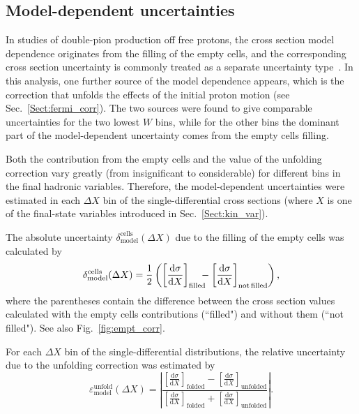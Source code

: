 \documentclass[prc,twocolumn,superscriptaddress,showpacs,amssymb,amsmath,amsfonts,aps,nofootinbib]{revtex4-1}
\begin{document}
\subsection{Model-dependent uncertainties}
\label{Sect:mod_dep}

In studies of double-pion production off free protons, the cross section model dependence originates from the filling of the empty cells, and the corresponding cross section uncertainty is commonly treated as a separate uncertainty type~\cite{Rip_an_note:2002,Ripani:2002ss,Fed_an_note:2007,Fedotov:2008aa,Isupov:2017lnd,Arjun,Fed_an_note:2017,Fed_paper_2018}. In this analysis, one further source of the model dependence appears, which is the correction that unfolds the effects of the initial proton motion (see Sec.\!~\ref{Sect:fermi_corr}). The two sources were found to give comparable uncertainties for the two lowest $W$ bins, while for the other bins the dominant part of the model-dependent uncertainty comes from the empty cells filling.

Both the contribution from the empty cells and the value of the unfolding correction vary greatly (from insignificant to considerable) for different bins in the final hadronic variables. Therefore, the model-dependent uncertainties were estimated in each $\Delta X$ bin of the single-differential cross sections (where $X$ is one of the final-state variables introduced in Sec.\!~\ref{Sect:kin_var}).


The absolute uncertainty $\delta^{\text{cells}}_{\text{model}}(\Delta X)$ due to the filling of the empty cells was calculated by
\begin{equation}
\delta^{\text{cells}}_{\text{model}} (\Delta X) = \frac{1}{2}\left ( \left [ \frac{\textrm{d}\sigma}{\textrm{d}X} \right ]_{\text{filled}}\!\!\!\! - \left [\frac{\textrm{d}\sigma}{\textrm{d}X} \right ]_{\text{not~\!filled}}\!~\!\right ),
\label{eq:error_mod_abs}
\end{equation}
where the parentheses contain the difference between the cross section values calculated with the empty cells contributions (``filled") and without them (``not filled"). See also Fig.\!~\ref{fig:empt_corr}.


For each $\Delta X$ bin of the single-differential distributions, the relative uncertainty due to the unfolding correction was estimated by
\begin{equation}
\varepsilon^{\text{unfold}}_{\text{model}} (\Delta X) = \left |\dfrac{\left [ \frac{\textrm{d}\sigma}{\textrm{d}X} \right ]_{\text{folded}} - \left [ \frac{\textrm{d}\sigma}{\textrm{d}X} \right ]_{\text{unfolded}}}{\left [ \frac{\textrm{d}\sigma}{\textrm{d}X} \right ]_{\text{folded}} + \left [ \frac{\textrm{d}\sigma}{\textrm{d}X} \right ]_{\text{unfolded}}} \right |.
\label{eq:rel_mod_err_fermi}
\end{equation}
\end{document}
